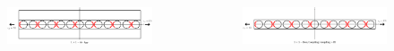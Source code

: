 \documentclass[first,firstsupp,lastsupp,last,hyperref,table]{ETHclass}
\begin{document}
\begin{frame}
\begin{columns}[c]
\begin{column}{0.5\textwidth}
\begin{figure}
\end{figure}
\end{column}
\end{columns}
\begin{columns}[c]
\centering
\begin{column}{0.5\textwidth}
\begin{figure}
\centering
\includegraphics[width=\columnwidth]{zeroplythickness.pdf}
\end{figure}
\end{column}
\begin{column}{0.5\textwidth}
\centering
\begin{figure}
\centering
\includegraphics[width=\columnwidth]{zeroplythickness-eqBC.pdf}
\end{figure}
\end{column}
\end{columns}
\end{frame}

\addtocounter{framenumber}{-1}
\end{document}
